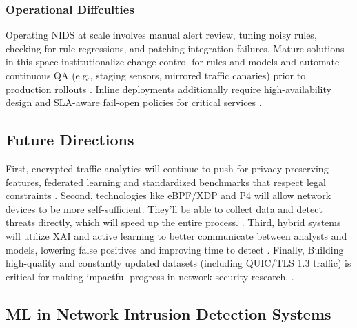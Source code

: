 \subsubsection{Operational Diffculties} 
Operating NIDS at scale involves manual alert review, tuning noisy rules, checking for rule regressions, and patching integration failures. Mature solutions in this space institutionalize change control for rules and models and automate continuous QA (e.g., staging sensors, mirrored traffic canaries) prior to production rollouts \parencite{CiscoSnort3Guide2024,SuricataDocs2025}. Inline deployments additionally require high-availability design  and SLA-aware fail-open policies for critical services \parencite{SuricataIPS2024}.

\subsection{Future Directions} 
First, encrypted-traffic analytics will continue to push for privacy-preserving features, federated learning and standardized benchmarks that respect legal constraints \parencite{Zhou2024TLS13Survey,VisQUIC2024}. Second, technologies like eBPF/XDP and P4 will allow network devices to be more self-sufficient. They'll be able to collect data and detect threats directly, which will speed up the entire process. \parencite{NSDI2023Electrode,P4NIDS2024,ASPLOS2023eHDL}. Third, hybrid systems will utilize XAI and active learning to better communicate between analysts and models, lowering false positives and improving time to detect \parencite{Cerasuolo2025Adaptable,Maseno2022HybridReview}. Finally, Building high-quality and constantly updated datasets (including QUIC/TLS 1.3 traffic) is critical for making impactful progress in network security research.
 \parencite{AppliedIntelligence2025Benchmark,KBS2025Datasets}.



\subsection{ML in Network Intrusion Detection Systems}

